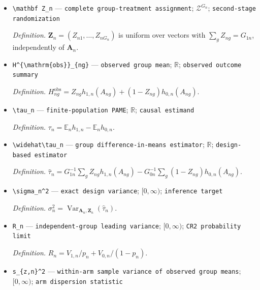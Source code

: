 \documentclass{article}
\begin{document}
\begin{itemize}
  \par\smallskip\noindent\emph{Definition.} \(\mathbf A_n=(A_{n1},\ldots,A_{nG_n})\) is uniform over ordered tuples of pairwise disjoint groups.
  \item \texttt{\textbackslash{}\allowbreak{}mathbf Z\_\allowbreak{}n} --- \texttt{complete group-\allowbreak{}treatment assignment}; \(\mathcal Z^{G_n}\); \texttt{second-\allowbreak{}stage randomization}
  \par\smallskip\noindent\emph{Definition.} \(\mathbf Z_n=(Z_{n1},\ldots,Z_{nG_n})\) is uniform over vectors with \(\sum_g Z_{ng}=G_{1n}\), independently of \(\mathbf A_n\).
  \item \texttt{H\textasciicircum{}\{\textbackslash{}\allowbreak{}mathrm\{obs\}\allowbreak{}\}\allowbreak{}\_\allowbreak{}\{ng\}\allowbreak{}} --- \texttt{observed group mean}; \(\mathbb R\); \texttt{observed outcome summary}
  \par\smallskip\noindent\emph{Definition.} \(H^{\mathrm{obs}}_{ng}=Z_{ng}h_{1,n}(A_{ng})+(1-Z_{ng})h_{0,n}(A_{ng})\).
  \item \texttt{\textbackslash{}\allowbreak{}tau\_\allowbreak{}n} --- \texttt{finite-\allowbreak{}population PAME}; \(\mathbb R\); \texttt{causal estimand}
  \par\smallskip\noindent\emph{Definition.} \(\tau_n=\mathbb E_n h_{1,n}-\mathbb E_n h_{0,n}\).
  \item \texttt{\textbackslash{}\allowbreak{}widehat\textbackslash{}\allowbreak{}tau\_\allowbreak{}n} --- \texttt{group difference-\allowbreak{}in-\allowbreak{}means estimator}; \(\mathbb R\); \texttt{design-\allowbreak{}based estimator}
  \par\smallskip\noindent\emph{Definition.} \(\widehat\tau_n=G_{1n}^{-1}\sum_gZ_{ng}h_{1,n}(A_{ng})-G_{0n}^{-1}\sum_g(1-Z_{ng})h_{0,n}(A_{ng})\).
  \item \texttt{\textbackslash{}\allowbreak{}sigma\_\allowbreak{}n\textasciicircum{}2} --- \texttt{exact design variance}; \([0,\infty)\); \texttt{inference target}
  \par\smallskip\noindent\emph{Definition.} \(\sigma_n^2=\operatorname{Var}_{\mathbf A_n,\mathbf Z_n}(\widehat\tau_n)\).
  \item \texttt{R\_\allowbreak{}n} --- \texttt{independent-\allowbreak{}group leading variance}; \([0,\infty)\); \texttt{CR2 probability limit}
  \par\smallskip\noindent\emph{Definition.} \(R_n=V_{1,n}/p_n+V_{0,n}/(1-p_n)\).
  \item \texttt{s\_\allowbreak{}\{z,\allowbreak{}n\}\allowbreak{}\textasciicircum{}2} --- \texttt{within-\allowbreak{}arm sample variance of observed group means}; \([0,\infty)\); \texttt{arm dispersion statistic}

\end{itemize}
\end{document}
